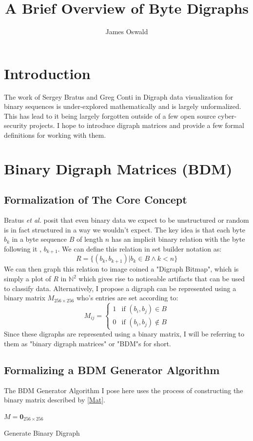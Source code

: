 \documentclass[12pt,a4paper]{article}
\begin{document}
\title{A Brief Overview of Byte Digraphs}
\author{James Oswald}

\maketitle

\section{Introduction}
The work of Sergey Bratus and Greg Conti in Digraph data visualization for binary sequences is under-explored mathematically and is largely unformalized. This has lead to it being largely forgotten outside of a few open source cyber-security projects. I hope to introduce digraph matrices and provide a few formal definitions for working with them. 

\section{Binary Digraph Matrices (BDM)}
\subsection{Formalization of The Core Concept}
Bratus \textit{et al.}\cite{voyage} posit that even binary data we expect to be unstructured or random is in fact structured in a way we wouldn't expect. The key idea is that each byte $b_k$ in a byte sequence $B$ of length $n$ has an implicit binary relation with the byte following it , $b_{k+1}$. We can define this relation in set builder notation as: 
\[
R = \{(b_k, b_{k+1})|b_k\in B \wedge k<n\} \tag{2.1} \label{Rel}
\]
We can then graph this relation to image coined a "Digraph Bitmap", which is simply a plot of $R$ in $\mathbb{N}^2$ which gives rise to noticeable artifacts that can be used to classify data. Alternatively, I propose a digraph can be represented using a binary matrix $M_{256\times256}$  who's entries are set according to: 
\[
M_{ij} = 
\left\{
\begin{array}{ll}
1 & \mbox{if }(b_i, b_j)\in B \\
0 & \mbox{if }(b_i, b_j)\notin B
\end{array}
\right.
\tag{2.2} \label{Mat}
\]
Since these digraphs are represented using a binary matrix, I will be referring to them as "binary digraph matrices" or "BDM"s for short.

\pagebreak
\subsection{Formalizing a BDM Generator Algorithm}
The BDM Generator Algorithm I pose here uses the process of constructing the binary matrix described by \eqref{Mat}.
\begin{algorithm}
\DontPrintSemicolon
{}
\BlankLine
$M = \textbf{0}_{256\times256}$\;
\caption{Generate Binary Digraph}
\label{bdgA}
\end{algorithm}
\end{document}
